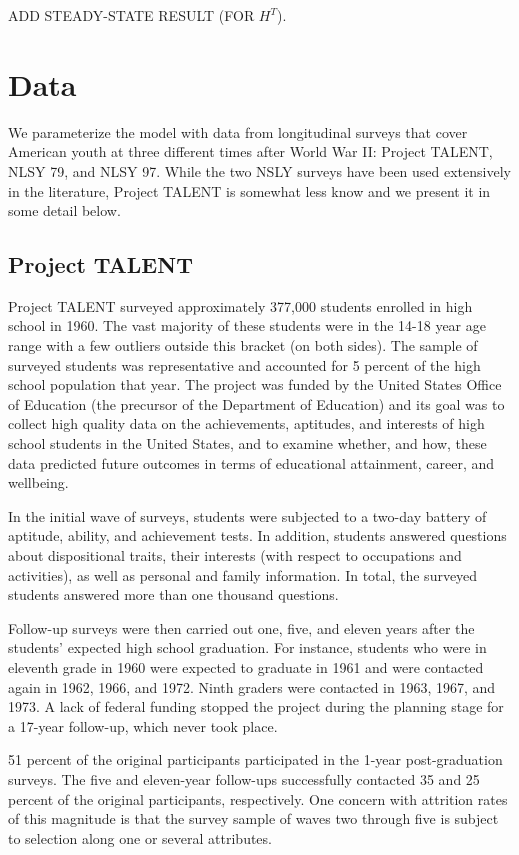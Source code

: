 \documentclass[onehalfspacing,11pt]{article}
\begin{document}
ADD STEADY-STATE RESULT (FOR $H^T$).

\section{Data}\label{sec:data}

We parameterize the model with data from longitudinal surveys that cover American youth at three different times after World War II: Project TALENT, NLSY 79, and NLSY 97. While the two NSLY surveys have been used extensively in the literature, Project TALENT is somewhat less know and we present it in some detail below.
\subsection{Project TALENT}

Project TALENT surveyed approximately 377,000 students enrolled in high school in 1960. The vast majority of these students were in the 14-18 year age range with a few outliers outside this bracket (on both sides). The sample of surveyed students was representative and accounted for 5 percent of the high school population that year. The project was funded by the United States Office of Education (the precursor of the Department of Education) and its goal was to collect high quality data on the achievements, aptitudes, and interests of high school students in the United States, and to examine whether, and how, these data predicted future outcomes in terms of educational attainment, career, and wellbeing.

In the initial wave of surveys, students were subjected to a two-day battery of aptitude, ability, and achievement tests. In addition, students answered questions about dispositional traits, their interests (with respect to occupations and activities), as well as personal and family information. 	In total, the surveyed students answered more than one thousand questions.

Follow-up surveys were then carried out one, five, and eleven years after the students' expected high school graduation. For instance, students who were in eleventh grade in 1960 were expected to graduate in 1961 and were contacted again in 1962, 1966, and 1972. Ninth graders were contacted in 1963, 1967, and 1973. A lack of federal funding stopped the project during the planning stage for a 17-year follow-up, which never took place.

51 percent of the original participants participated in the 1-year post-graduation surveys. The five and eleven-year follow-ups successfully contacted 35 and 25 percent of the original participants, respectively. One concern with attrition rates of this magnitude is that the survey sample of waves two through five is subject to selection along one or several attributes.
\end{document}
